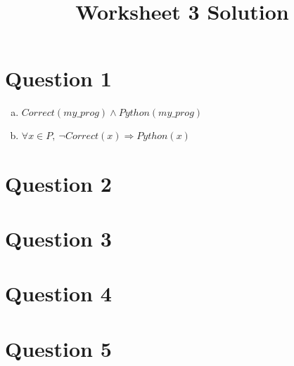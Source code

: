\documentclass[12pt]{article}
\begin{document}
\title{Worksheet 3 Solution}
\maketitle

\section*{Question 1}

\begin{enumerate}[a)]
    \item
        $Correct(my\_prog) \land Python(my\_prog)$
    \item
        $\forall x \in P,\: \neg Correct(x) \Rightarrow Python(x)$
\end{enumerate}

\section*{Question 2}

\section*{Question 3}

\section*{Question 4}

\section*{Question 5}
\end{document}
